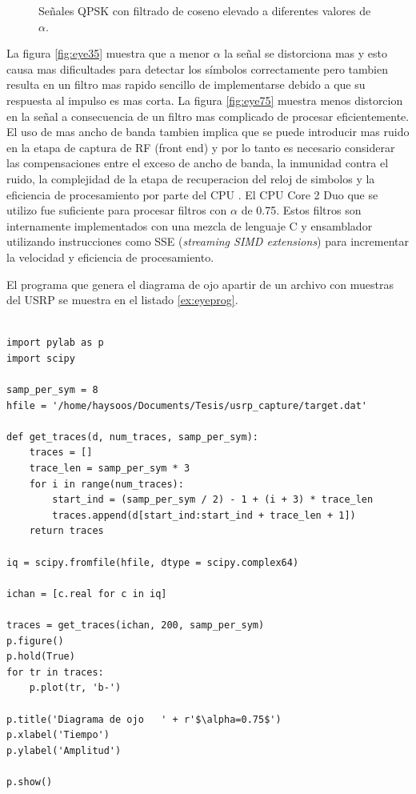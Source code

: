 \begin{figure}[htp]
  \vspace{0.3in}
  \caption{Se\~nales QPSK con filtrado de coseno elevado a diferentes valores de $\alpha$.}
  \label{fig:rrcsignals}
\end{figure}

La figura \ref{fig:eye35} muestra que a menor $\alpha$ la se\~nal se distorciona mas y esto causa mas
dificultades para detectar los s\'imbolos correctamente pero tambien resulta en un filtro mas rapido
sencillo de implementarse debido a que su respuesta al impulso es mas corta. La figura
\ref{fig:eye75} muestra menos distorcion en la se\~nal a consecuencia de un filtro mas complicado de
procesar eficientemente. El uso de mas ancho de banda tambien implica que se puede introducir mas
ruido en la etapa de captura de RF (front end) y por lo tanto es necesario considerar las
compensaciones entre el exceso de ancho de banda, la inmunidad contra el ruido, la complejidad de
la etapa de recuperacion del reloj de simbolos y la eficiencia de procesamiento por parte del CPU
\cite{lee}. El CPU Core 2 Duo que se utilizo fue suficiente para procesar filtros con $\alpha$ de
0.75. Estos filtros son internamente implementados con una mezcla de lenguaje C y ensamblador utilizando
instrucciones como SSE (\emph{streaming SIMD extensions}) para incrementar la velocidad y eficiencia
de procesamiento.

El programa que genera el diagrama de ojo apartir de un archivo con muestras del USRP se muestra en
el listado \ref{ex:eyeprog}.
\begin{lstlisting}[float, label=ex:eyeprog, caption={Programa que genera el diagrama de ojo a partir
de muestras tomadas del USRP.}, breaklines=true]

import pylab as p
import scipy

samp_per_sym = 8
hfile = '/home/haysoos/Documents/Tesis/usrp_capture/target.dat'

def get_traces(d, num_traces, samp_per_sym):
    traces = []
    trace_len = samp_per_sym * 3
    for i in range(num_traces):
        start_ind = (samp_per_sym / 2) - 1 + (i + 3) * trace_len
        traces.append(d[start_ind:start_ind + trace_len + 1])
    return traces
    
iq = scipy.fromfile(hfile, dtype = scipy.complex64)

ichan = [c.real for c in iq]

traces = get_traces(ichan, 200, samp_per_sym)
p.figure()
p.hold(True)
for tr in traces:
    p.plot(tr, 'b-')

p.title('Diagrama de ojo   ' + r'$\alpha=0.75$')
p.xlabel('Tiempo')
p.ylabel('Amplitud')

p.show()
\end{lstlisting}

